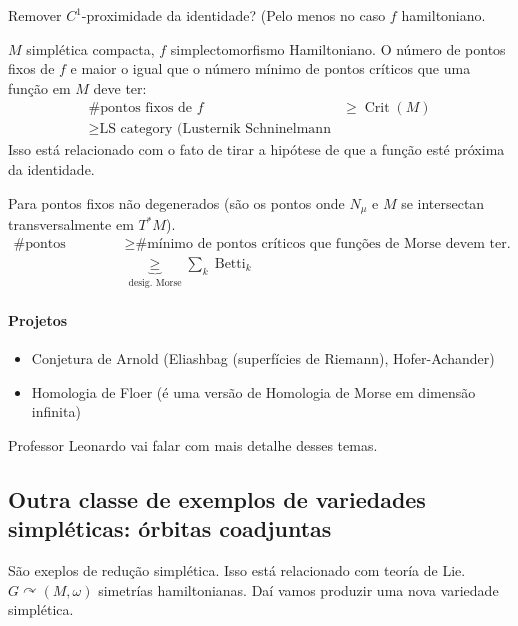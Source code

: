 \begin{question}
	Remover $C^1$-proximidade da identidade? (Pelo menos no caso $f$ hamiltoniano.
\end{question}

\begin{conjecture}[Arnold]
	$M$ simpl\'etica compacta, $f$ simplectomorfismo Hamiltoniano. O n\'umero de pontos fixos de $f$ e maior o igual que o n\'umero m\'inimo de pontos cr\'iticos que uma fun\c c\~ao em $M$ deve ter:
	\begin{align*}
		\text{\# pontos fixos de $f$}&\geq \operatorname{Crit}(M)\\
		\geq  \text{LS category (Lusternik Schninelmann} 
	\end{align*}
Isso est\'a relacionado com o fato de tirar a hip\'otese de que a fun\c c\~ao est\'e pr\'oxima da identidade.
\end{conjecture}

\begin{conjecture}
	Para pontos fixos n\~ao degenerados (s\~ao os pontos onde $N_\mu$ e  $M$ se intersectan transversalmente em $T^*M$).
	\begin{align*}
		\text{\# pontos cr\'iticos} &\geq \text{\# m\'inimo de pontos cr\'iticos que fun\c c\~oes de Morse devem ter.}\\
		&\underbrace{\geq }_{\text{desig. Morse} } \sum_{k}\operatorname{Betti}_{k}
	\end{align*}
\end{conjecture}

\paragraph{Projetos} 
\begin{itemize}
\item Conjetura de Arnold (Eliashbag (superf\'icies de Riemann), Hofer-Achander)
\item Homologia de Floer (\'e uma vers\~ao de Homologia de Morse em dimens\~ao infinita)
\end{itemize}

Professor Leonardo vai falar com mais detalhe desses temas.

\subsection{Outra classe de exemplos de variedades simpl\'eticas: \'orbitas coadjuntas}

S\~ao exeplos de redu\c c\~ao simpl\'etica. Isso est\'a relacionado com teor\'ia de Lie. $G \curvearrowright (M,\omega)$ simetr\'ias hamiltonianas. Da\'i vamos produzir uma nova variedade simpl\'etica.

